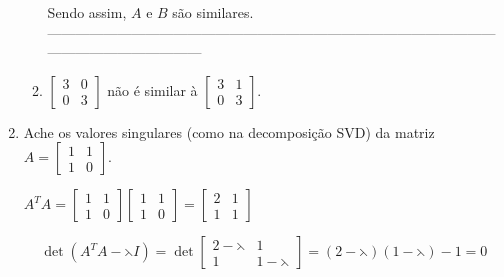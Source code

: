 \documentclass[leqno]{article}
\numberwithin{equation}{section}
\begin{document}
\begin{enumerate}
\begin{enumerate}
\begin{sol}
			Sendo assim, $A$ e $B$ são similares.\\
			---------------------------------------------------------------------------------------------------------------------------------
			\end{sol}
		
			\item $\begin{bmatrix}
				3 & 0 \\
				0 & 3
			\end{bmatrix}$ não é similar à $\begin{bmatrix}
				3 & 1 \\
				0 & 3
			\end{bmatrix}$.
			
			\begin{sol} 
				   
			\end{sol} 
			
		\end{enumerate}
		
		
		\item Ache os valores singulares (como na decomposição SVD) da matriz $A = \begin{bmatrix}
			1 & 1 \\
			1 & 0
		\end{bmatrix}$.
		
		\begin{sol} 
		$A^T A = \begin{bmatrix}
			1 & 1 \\
			1 & 0
		\end{bmatrix}\begin{bmatrix}
			1 & 1 \\
			1 & 0
		\end{bmatrix} = \begin{bmatrix}
		2 & 1 \\
		1 & 1
		\end{bmatrix}$ 
	
		$$\det(A^T A - \leftthreetimes I) = \det \begin{bmatrix}
			2 - \leftthreetimes & 1 \\
			1 & 1 - \leftthreetimes
		\end{bmatrix} = (2 - \leftthreetimes)(1 - \leftthreetimes) - 1 = 0$$
	

\end{sol}
\end{enumerate}
\end{document}
